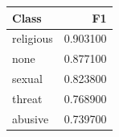 \begin{tabular}{lr}
\toprule
Class & F1 \\
\midrule
religious & 0.903100 \\
none & 0.877100 \\
sexual & 0.823800 \\
threat & 0.768900 \\
abusive & 0.739700 \\
\bottomrule
\end{tabular}
